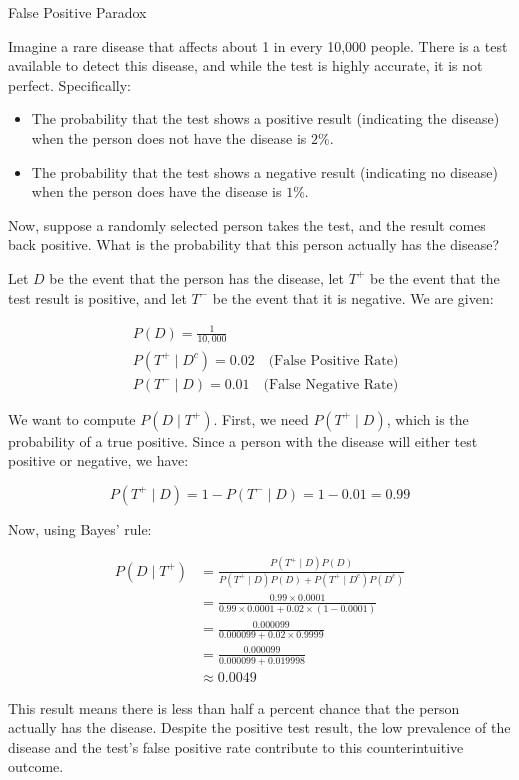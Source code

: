 \begin{example} False Positive Paradox

   Imagine a rare disease that affects about 1 in every 10,000 people. There is a test available to detect this disease, and while the test is highly accurate, it is not perfect. Specifically:
\begin{itemize}
    \item The probability that the test shows a positive result (indicating the disease) when the person does not have the disease is $2 \%$.
    \item The probability that the test shows a negative result (indicating no disease) when the person does have the disease is $1 \%$.
\end{itemize}

Now, suppose a randomly selected person takes the test, and the result comes back positive. What is the probability that this person actually has the disease?
\end{example}

\begin{solution}
    Let \( D \) be the event that the person has the disease, let \( T^+ \) be the event that the test result is positive, and let \( T^- \) be the event that it is negative. We are given:

\[
\begin{aligned}
& P(D) = \frac{1}{10,000} \\
& P\left(T^+ \mid D^c\right) = 0.02 \quad \text{(False Positive Rate)} \\
& P\left(T^- \mid D\right) = 0.01 \quad \text{(False Negative Rate)}
\end{aligned}
\]

We want to compute \( P(D \mid T^+) \). First, we need \( P(T^+ \mid D) \), which is the probability of a true positive. Since a person with the disease will either test positive or negative, we have:

\[
P(T^+ \mid D) = 1 - P(T^- \mid D) = 1 - 0.01 = 0.99
\]

Now, using Bayes' rule:

\[
\begin{aligned}
P(D \mid T^+) &= \frac{P(T^+ \mid D) P(D)}{P(T^+ \mid D) P(D) + P\left(T^+ \mid D^c\right) P\left(D^c\right)} \\
&= \frac{0.99 \times 0.0001}{0.99 \times 0.0001 + 0.02 \times (1 - 0.0001)} \\
&= \frac{0.000099}{0.000099 + 0.02 \times 0.9999} \\
&= \frac{0.000099}{0.000099 + 0.019998} \\
&\approx 0.0049
\end{aligned}
\]

This result means there is less than half a percent chance that the person actually has the disease. Despite the positive test result, the low prevalence of the disease and the test's false positive rate contribute to this counterintuitive outcome.
\end{solution}

